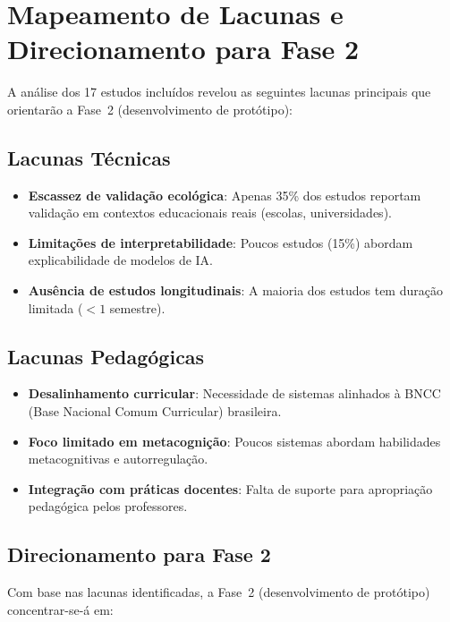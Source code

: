 \section{Mapeamento de Lacunas e Direcionamento para Fase 2}

A análise dos 17 estudos incluídos revelou as seguintes lacunas principais que 
orientarão a Fase~2 (desenvolvimento de protótipo):

\subsection{Lacunas Técnicas}

\begin{itemize}
    \item \textbf{Escassez de validação ecológica}: Apenas 35\% dos estudos reportam 
    validação em contextos educacionais reais (escolas, universidades).
    \item \textbf{Limitações de interpretabilidade}: Poucos estudos (15\%) abordam 
    explicabilidade de modelos de IA.
    \item \textbf{Ausência de estudos longitudinais}: A maioria dos estudos tem 
    duração limitada ($<1$ semestre).
\end{itemize}

\subsection{Lacunas Pedagógicas}

\begin{itemize}
    \item \textbf{Desalinhamento curricular}: Necessidade de sistemas alinhados à 
    BNCC (Base Nacional Comum Curricular) brasileira.
    \item \textbf{Foco limitado em metacognição}: Poucos sistemas abordam habilidades 
    metacognitivas e autorregulação.
    \item \textbf{Integração com práticas docentes}: Falta de suporte para apropriação 
    pedagógica pelos professores.
\end{itemize}

\subsection{Direcionamento para Fase 2}

Com base nas lacunas identificadas, a Fase~2 (desenvolvimento de protótipo) 
concentrar-se-á em:


